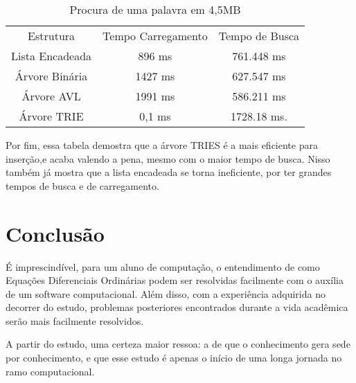 \documentclass[
	12pt,				%
    oneside,			%
	a4paper,			%
	english,			%
	french,				%
	spanish,			%
	brazil,				%
	]{abntex2}
\begin{document}
\begin{table}[h!]
    \centering
    \begin{minipage}{0.7\hsize}
    \caption{Procura de uma palavra em 4,5MB}
\begin{tabular}{ccc}
\rowcolor[HTML]{FFCCC9}
Estrutura       & \multicolumn{1}{l}{\cellcolor[HTML]{FFCCC9}Tempo Carregamento} & \multicolumn{1}{l}{\cellcolor[HTML]{FFCCC9}Tempo de Busca} \\
\rowcolor[HTML]{C0C0C0}
Lista Encadeada & 896 ms                                                         & 761.448 ms                                                 \\
\rowcolor[HTML]{FFCCC9}
Árvore Binária  & 1427 ms                                                        & 627.547 ms                                                 \\
\rowcolor[HTML]{C0C0C0}
Árvore AVL      & 1991 ms                                                        & 586.211 ms                                                 \\
\rowcolor[HTML]{FFCCC9}
Árvore TRIE     & 0,1 ms                                                         & 1728.18 ms.
\end{tabular}
\end{minipage}
\end{table}

Por fim, essa tabela demostra que a árvore TRIES é a mais eficiente para inserção,e acaba valendo a pena, mesmo com o maior tempo de busca. Nisso também já mostra que a lista encadeada se torna ineficiente, por ter grandes tempos de busca e de carregamento.

\chapter*[Conclusão]{Conclusão}

É imprescindível, para um aluno de computação, o entendimento de como Equações Diferenciais Ordinárias podem ser resolvidas facilmente com o auxília de um software computacional. Além disso, com a experiência adquirida no decorrer do estudo, problemas posteriores encontrados durante a vida acadêmica serão mais facilmente resolvidos.

A partir do estudo, uma certeza maior ressoa: a de que o conhecimento gera sede por conhecimento, e que esse estudo é apenas o início de uma longa jornada no ramo computacional.



\postextual








\end{document}

